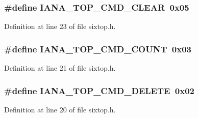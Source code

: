 \subsubsection[{\texorpdfstring{I\+A\+N\+A\+\_\+6\+T\+O\+P\+\_\+\+C\+M\+D\+\_\+\+C\+L\+E\+AR}{IANA_6TOP_CMD_CLEAR}}]{\setlength{\rightskip}{0pt plus 5cm}\#define I\+A\+N\+A\+\_\+T\+O\+P\+\_\+\+C\+M\+D\+\_\+\+C\+L\+E\+AR~0x05}\hypertarget{group__sixtop_ga0bdf7483c22f454cdbaa4b66bb13bd6c}{}\label{group__sixtop_ga0bdf7483c22f454cdbaa4b66bb13bd6c}


Definition at line 23 of file sixtop.\+h.

\subsubsection[{\texorpdfstring{I\+A\+N\+A\+\_\+6\+T\+O\+P\+\_\+\+C\+M\+D\+\_\+\+C\+O\+U\+NT}{IANA_6TOP_CMD_COUNT}}]{\setlength{\rightskip}{0pt plus 5cm}\#define I\+A\+N\+A\+\_\+T\+O\+P\+\_\+\+C\+M\+D\+\_\+\+C\+O\+U\+NT~0x03}\hypertarget{group__sixtop_ga5fc5a89e85fa0537ec21d7c6b4fe5241}{}\label{group__sixtop_ga5fc5a89e85fa0537ec21d7c6b4fe5241}


Definition at line 21 of file sixtop.\+h.

\subsubsection[{\texorpdfstring{I\+A\+N\+A\+\_\+6\+T\+O\+P\+\_\+\+C\+M\+D\+\_\+\+D\+E\+L\+E\+TE}{IANA_6TOP_CMD_DELETE}}]{\setlength{\rightskip}{0pt plus 5cm}\#define I\+A\+N\+A\+\_\+T\+O\+P\+\_\+\+C\+M\+D\+\_\+\+D\+E\+L\+E\+TE~0x02}\hypertarget{group__sixtop_gadb01974cc07399fc01209c4a94a35eb4}{}\label{group__sixtop_gadb01974cc07399fc01209c4a94a35eb4}


Definition at line 20 of file sixtop.\+h.

